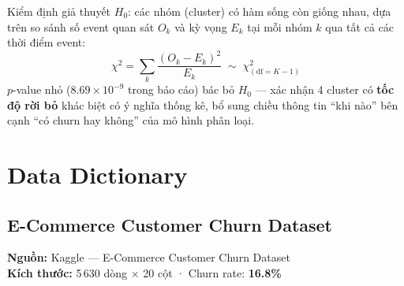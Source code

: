 \documentclass[12pt,a4paper]{article}
\begin{document}
Kiểm định giả thuyết $H_0$: các nhóm (cluster) có hàm sống còn giống nhau, dựa trên so sánh số
event quan sát $O_{k}$ và kỳ vọng $E_k$ tại mỗi nhóm $k$ qua tất cả các thời điểm event:
\[
  \chi^2 = \sum_{k} \dfrac{(O_k - E_k)^2}{E_k} \;\sim\; \chi^2_{(\text{df}=K-1)}
\]
$p$-value nhỏ ($8.69\times 10^{-9}$ trong báo cáo) bác bỏ $H_0$ --- xác nhận 4 cluster có
\textbf{tốc độ rời bỏ} khác biệt có ý nghĩa thống kê, bổ sung chiều thông tin ``khi nào'' bên cạnh
``có churn hay không'' của mô hình phân loại.

\section{Data Dictionary}

\subsection{E-Commerce Customer Churn Dataset}

\textbf{Nguồn:} Kaggle --- E-Commerce Customer Churn Dataset\\
\textbf{Kích thước:} 5\,630 dòng $\times$ 20 cột · Churn rate: \textbf{16.8\%}
\end{document}
